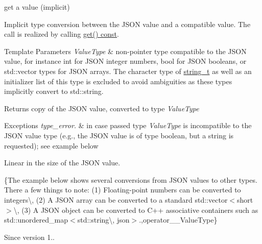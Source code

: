 get a value (implicit) 

Implicit type conversion between the J\+S\+ON value and a compatible value. The call is realized by calling \hyperlink{classnlohmann_1_1basic__json_ab513e91d419a880ee59e559e05586db6}{get() const}.


\begin{DoxyTemplParams}{Template Parameters}
{\em Value\+Type} & non-\/pointer type compatible to the J\+S\+ON value, for instance {\ttfamily int} for J\+S\+ON integer numbers, {\ttfamily bool} for J\+S\+ON booleans, or {\ttfamily std\+::vector} types for J\+S\+ON arrays. The character type of \hyperlink{classnlohmann_1_1basic__json_a33593865ffb1860323dcbd52425b90c8}{string\+\_\+t} as well as an initializer list of this type is excluded to avoid ambiguities as these types implicitly convert to {\ttfamily std\+::string}.\\
\hline
\end{DoxyTemplParams}
\begin{DoxyReturn}{Returns}
copy of the J\+S\+ON value, converted to type {\itshape Value\+Type} 
\end{DoxyReturn}

\begin{DoxyExceptions}{Exceptions}
{\em type\+\_\+error.} & in case passed type {\itshape Value\+Type} is incompatible to the J\+S\+ON value type (e.\+g., the J\+S\+ON value is of type boolean, but a string is requested); see example below\\
\hline
\end{DoxyExceptions}
Linear in the size of the J\+S\+ON value.

\{The example below shows several conversions from J\+S\+ON values to other types. There a few things to note\+: (1) Floating-\/point numbers can be converted to integers\textbackslash{}, (2) A J\+S\+ON array can be converted to a standard {\ttfamily std\+::vector$<$short$>$}\textbackslash{}, (3) A J\+S\+ON object can be converted to C++ associative containers such as {\ttfamily std\+::unordered\+\_\+map$<$std\+::string\textbackslash{}, json$>$}.,operator\+\_\+\+\_\+\+Value\+Type\}

\begin{DoxySince}{Since}
version 1.. 
\end{DoxySince}
